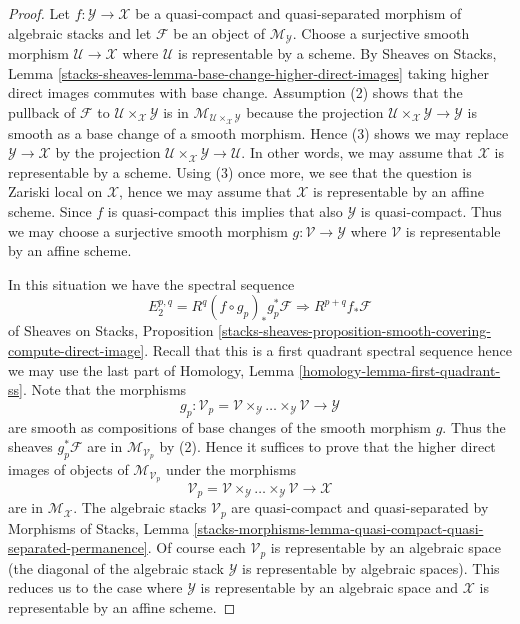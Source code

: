 \documentclass{stacks-project}
\theoremstyle{plain}
\theoremstyle{definition}
\theoremstyle{remark}
\numberwithin{equation}{subsection}
\begin{document}
\begin{proof}
Let $f : \mathcal{Y} \to \mathcal{X}$ be a quasi-compact and quasi-separated
morphism of algebraic stacks and let $\mathcal{F}$ be an object of
$\mathcal{M}_\mathcal{Y}$. Choose a surjective smooth morphism
$\mathcal{U} \to \mathcal{X}$ where $\mathcal{U}$ is representable by
a scheme. By
Sheaves on Stacks, Lemma
\ref{stacks-sheaves-lemma-base-change-higher-direct-images}
taking higher direct images commutes with base change.
Assumption (2) shows that the pullback of $\mathcal{F}$
to $\mathcal{U} \times_\mathcal{X} \mathcal{Y}$ is in
$\mathcal{M}_{\mathcal{U} \times_\mathcal{X} \mathcal{Y}}$
because the projection
$\mathcal{U} \times_\mathcal{X} \mathcal{Y} \to \mathcal{Y}$
is smooth as a base change of a smooth morphism. Hence (3) shows we may
replace $\mathcal{Y} \to \mathcal{X}$ by the projection
$\mathcal{U} \times_\mathcal{X} \mathcal{Y} \to \mathcal{U}$.
In other words, we may assume that $\mathcal{X}$
is representable by a scheme.
Using (3) once more, we see that the question is Zariski local on
$\mathcal{X}$, hence we may assume that $\mathcal{X}$ is representable by
an affine scheme. Since $f$ is quasi-compact this implies that also
$\mathcal{Y}$ is quasi-compact. Thus we may choose a surjective smooth
morphism $g : \mathcal{V} \to \mathcal{Y}$ where $\mathcal{V}$ is representable
by an affine scheme.

\medskip\noindent
In this situation we have the spectral sequence
$$
E_2^{p, q} = R^q(f \circ g_p)_*g_p^*\mathcal{F}
\Rightarrow
R^{p + q}f_*\mathcal{F}
$$
of
Sheaves on Stacks, Proposition
\ref{stacks-sheaves-proposition-smooth-covering-compute-direct-image}.
Recall that this is a first quadrant spectral sequence hence we may
use the last part of Homology, Lemma \ref{homology-lemma-first-quadrant-ss}.
Note that the morphisms
$$
g_p : \mathcal{V}_p =
\mathcal{V} \times_\mathcal{Y} \ldots \times_\mathcal{Y} \mathcal{V}
\longrightarrow
\mathcal{Y}
$$
are smooth as compositions of base changes of the smooth morphism $g$.
Thus the sheaves $g_p^*\mathcal{F}$ are in
$\mathcal{M}_{\mathcal{V}_p}$ by (2). Hence it suffices to prove that the
higher direct images of objects of $\mathcal{M}_{\mathcal{V}_p}$ under
the morphisms
$$
\mathcal{V}_p =
\mathcal{V} \times_\mathcal{Y} \ldots \times_\mathcal{Y} \mathcal{V}
\longrightarrow
\mathcal{X}
$$
are in $\mathcal{M}_\mathcal{X}$. The algebraic stacks $\mathcal{V}_p$
are quasi-compact and quasi-separated by
Morphisms of Stacks, Lemma
\ref{stacks-morphisms-lemma-quasi-compact-quasi-separated-permanence}.
Of course each $\mathcal{V}_p$ is representable by an algebraic space
(the diagonal of the algebraic stack $\mathcal{Y}$ is representable
by algebraic spaces). This reduces us to the case where
$\mathcal{Y}$ is representable by an algebraic space and $\mathcal{X}$
is representable by an affine scheme.


\end{proof}
\end{document}
